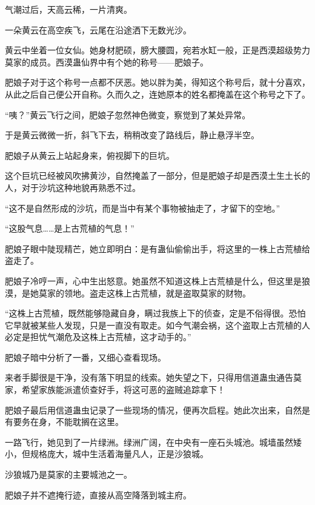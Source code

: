 
\begin{this_body}



气潮过后，天高云稀，一片清爽。

一朵黄云在高空疾飞，云尾在沿途洒下无数光沙。

黄云中坐着一位女仙。她身材肥硕，膀大腰圆，宛若水缸一般，正是西漠超级势力莫家的成员。西漠蛊仙界中有个她的称号——肥娘子。

肥娘子对于这个称号一点都不厌恶。她以胖为美，得知这个称号后，就十分喜欢，从此之后自己便公开自称。久而久之，连她原本的姓名都掩盖在这个称号之下了。

“咦？”黄云飞行之间，肥娘子忽然神色微变，察觉到了某处异常。

于是黄云微微一折，斜飞下去，稍稍改变了路线后，静止悬浮半空。

肥娘子从黄云上站起身来，俯视脚下的巨坑。

这个巨坑已经被风吹拂黄沙，自然掩盖了一部分，但是肥娘子却是西漠土生土长的人，对于沙坑这种地貌再熟悉不过。

“这不是自然形成的沙坑，而是当中有某个事物被抽走了，才留下的空地。”

“这股气息……是上古荒植的气息！”

肥娘子眼中陡现精芒，她立即明白：是有蛊仙偷偷出手，将这里的一株上古荒植给盗走了。

肥娘子冷哼一声，心中生出怒意。她虽然不知道这株上古荒植是什么，但这里是狼漠，是她莫家的领地。盗走这株上古荒植，就是盗取莫家的财物。

“这株上古荒植，既然能够隐藏自身，瞒过我族上下的侦查，定是不俗得很。恐怕它早就被某些人发现，只是一直没有取走。如今气潮会祸，这个盗取上古荒植的人必定是担忧气潮危及这株上古荒植，这才动手的。”

肥娘子暗中分析了一番，又细心查看现场。

来者手脚很是干净，没有落下明显的线索。她失望之下，只得用信道蛊虫通告莫家，希望家族能派遣侦查好手，将这可恶的盗贼追踪拿下！

肥娘子最后用信道蛊虫记录了一些现场的情况，便再次启程。她此次出来，自然是有要务在身，不能耽搁在这里。

一路飞行，她见到了一片绿洲。绿洲广阔，在中央有一座石头城池。城墙虽然矮小，但规格庞大，城中生活着海量凡人，正是沙狼城。

沙狼城乃是莫家的主要城池之一。

肥娘子并不遮掩行迹，直接从高空降落到城主府。


\end{this_body}
